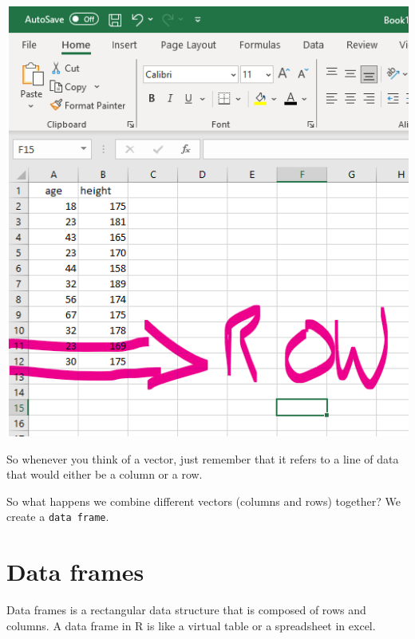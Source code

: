 \documentclass[
]{book}
\begin{document}
\includegraphics{img/03-row-vector.png}

So whenever you think of a vector, just remember that it refers to a line of data that would either be a column or a row.

So what happens we combine different vectors (columns and rows) together? We create a \texttt{data\ frame}.

\hypertarget{data-frames}{%
\section{Data frames}\label{data-frames}}

Data frames is a rectangular data structure that is composed of rows and columns. A data frame in R is like a virtual table or a spreadsheet in excel.
\end{document}
